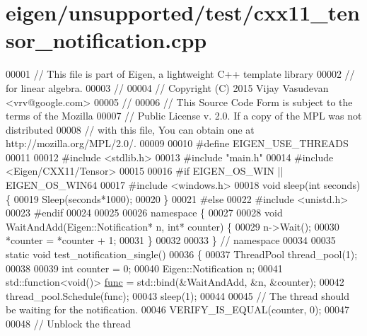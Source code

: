 \hypertarget{eigen_2unsupported_2test_2cxx11__tensor__notification_8cpp_source}{}\section{eigen/unsupported/test/cxx11\+\_\+tensor\+\_\+notification.cpp}
\label{eigen_2unsupported_2test_2cxx11__tensor__notification_8cpp_source}

\begin{DoxyCode}
00001 \textcolor{comment}{// This file is part of Eigen, a lightweight C++ template library}
00002 \textcolor{comment}{// for linear algebra.}
00003 \textcolor{comment}{//}
00004 \textcolor{comment}{// Copyright (C) 2015 Vijay Vasudevan <vrv@google.com>}
00005 \textcolor{comment}{//}
00006 \textcolor{comment}{// This Source Code Form is subject to the terms of the Mozilla}
00007 \textcolor{comment}{// Public License v. 2.0. If a copy of the MPL was not distributed}
00008 \textcolor{comment}{// with this file, You can obtain one at http://mozilla.org/MPL/2.0/.}
00009 
00010 \textcolor{preprocessor}{#define EIGEN\_USE\_THREADS}
00011 
00012 \textcolor{preprocessor}{#include <stdlib.h>}
00013 \textcolor{preprocessor}{#include "main.h"}
00014 \textcolor{preprocessor}{#include <Eigen/CXX11/Tensor>}
00015 
00016 \textcolor{preprocessor}{#if EIGEN\_OS\_WIN || EIGEN\_OS\_WIN64}
00017 \textcolor{preprocessor}{#include <windows.h>}
00018 \textcolor{keywordtype}{void} sleep(\textcolor{keywordtype}{int} seconds) \{
00019   Sleep(seconds*1000);
00020 \}
00021 \textcolor{preprocessor}{#else}
00022 \textcolor{preprocessor}{#include <unistd.h>}
00023 \textcolor{preprocessor}{#endif}
00024 
00025 
00026 \textcolor{keyword}{namespace }\{
00027 
00028 \textcolor{keywordtype}{void} WaitAndAdd(Eigen::Notification* n, \textcolor{keywordtype}{int}* counter) \{
00029   n->Wait();
00030   *counter = *counter + 1;
00031 \}
00032 
00033 \}  \textcolor{comment}{// namespace}
00034 
00035 \textcolor{keyword}{static} \textcolor{keywordtype}{void} test\_notification\_single()
00036 \{
00037   ThreadPool thread\_pool(1);
00038 
00039   \textcolor{keywordtype}{int} counter = 0;
00040   Eigen::Notification n;
00041   std::function<void()> \hyperlink{structfunc}{func} = std::bind(&WaitAndAdd, &n, &counter);
00042   thread\_pool.Schedule(func);
00043   sleep(1);
00044 
00045   \textcolor{comment}{// The thread should be waiting for the notification.}
00046   VERIFY\_IS\_EQUAL(counter, 0);
00047 
00048   \textcolor{comment}{// Unblock the thread}

\end{DoxyCode}
